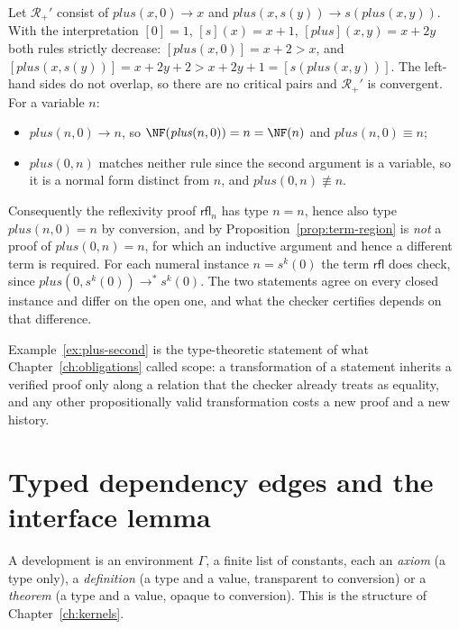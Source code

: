 \begin{example}
\label{ex:plus-second}
Let $\mathcal R_{+}'$ consist of $\mathit{plus}(x,0)\to x$ and $\mathit{plus}(x,s(y))\to s(\mathit{plus}(x,y))$. With the interpretation $[0]=1$, $[s](x)=x+1$, $[\mathit{plus}](x,y)=x+2y$ both rules strictly decrease: $[\mathit{plus}(x,0)]=x+2>x$, and $[\mathit{plus}(x,s(y))]=x+2y+2>x+2y+1=[s(\mathit{plus}(x,y))]$. The left-hand sides do not overlap, so there are no critical pairs and $\mathcal R_+'$ is convergent. For a variable $n$:
\begin{itemize}[nosep]
\item $\mathit{plus}(n,0)\to n$, so $\NF(\mathit{plus}(n,0))=n=\NF(n)$ and $\mathit{plus}(n,0)\equiv n$;
\item $\mathit{plus}(0,n)$ matches neither rule since the second argument is a variable, so it is a normal form distinct from $n$, and $\mathit{plus}(0,n)\not\equiv n$.
\end{itemize}
Consequently the reflexivity proof $\mathsf{rfl}_n$ has type $n=n$, hence also type $\mathit{plus}(n,0)=n$ by conversion, and by Proposition~\ref{prop:term-region} is \emph{not} a proof of $\mathit{plus}(0,n)=n$, for which an inductive argument and hence a different term is required. For each numeral instance $n=s^k(0)$ the term $\mathsf{rfl}$ does check, since $\mathit{plus}(0,s^k(0))\to^{*}s^k(0)$. The two statements agree on every closed instance and differ on the open one, and what the checker certifies depends on that difference.
\end{example}

Example~\ref{ex:plus-second} is the type-theoretic statement of what Chapter~\ref{ch:obligations} called scope: a transformation of a statement inherits a verified proof only along a relation that the checker already treats as equality, and any other propositionally valid transformation costs a new proof and a new history.

\section{Typed dependency edges and the interface lemma}
\label{sec:typed-edges}

A development is an environment $\Gamma$, a finite list of constants, each an \emph{axiom} (a type only), a \emph{definition} (a type and a value, transparent to conversion) or a \emph{theorem} (a type and a value, opaque to conversion). This is the structure of Chapter~\ref{ch:kernels}.

